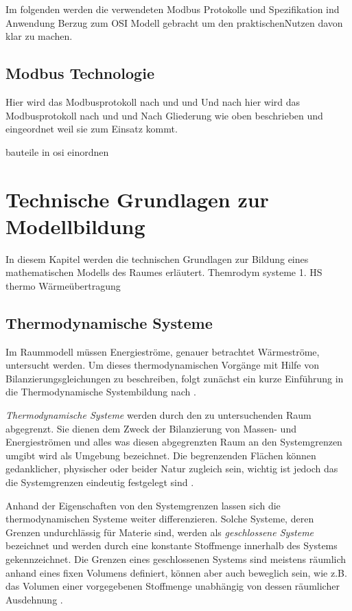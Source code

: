 Im folgenden werden die verwendeten Modbus Protokolle und Spezifikation ind Anwendung Berzug zum OSI Modell gebracht um den praktischenNutzen davon klar zu machen.


\subsection{Modbus Technologie}

Hier wird das Modbusprotokoll nach \cite{mod12} und \cite{mod06ser} und \cite{mod06tcp}  
Und nach hier wird das Modbusprotokoll nach \cite[S.5]{mod12} und \cite[S.5]{mod06ser} und \cite[S.5]{mod06tcp}
Nach Gliederung wie oben beschrieben und eingeordnet weil sie zum Einsatz kommt.

bauteile in osi einordnen



\section{Technische Grundlagen zur Modellbildung}
\label{sec:grundlagenmodell}
In diesem Kapitel werden die technischen Grundlagen zur Bildung eines mathematischen Modells des Raumes erläutert.
Themrodym systeme
1. HS thermo
Wärmeübertragung

\subsection{Thermodynamische Systeme}
Im Raummodell müssen Energieströme, genauer betrachtet Wärmeströme, untersucht werden. Um dieses thermodynamischen Vorgänge mit Hilfe von Bilanzierungsgleichungen zu beschreiben, folgt zunächst ein kurze Einführung in die Thermodynamische Systembildung nach \cite[S.~11ff.]{ba12}.

\textit{Thermodynamische Systeme} werden durch den zu untersuchenden Raum abgegrenzt. Sie dienen dem Zweck der Bilanzierung von Massen- und Energieströmen und alles was diesen abgegrenzten Raum an den Systemgrenzen umgibt wird als Umgebung bezeichnet. Die begrenzenden Flächen können gedanklicher, physischer oder beider Natur zugleich sein, wichtig ist jedoch das die Systemgrenzen eindeutig festgelegt sind \cite[S.~11]{ba12}.

Anhand der Eigenschaften von den Systemgrenzen lassen sich die thermodynamischen Systeme weiter differenzieren.
Solche Systeme, deren Grenzen undurchlässig für Materie sind, werden als \textit{geschlossene Systeme} bezeichnet und werden durch eine konstante Stoffmenge innerhalb des Systems gekennzeichnet. Die Grenzen eines geschlossenen Systems sind meistens räumlich anhand eines fixen Volumens definiert, können aber auch beweglich sein, wie z.B. das Volumen einer vorgegebenen Stoffmenge unabhängig von dessen räumlicher Ausdehnung \cite[S.~12]{ba12}.

